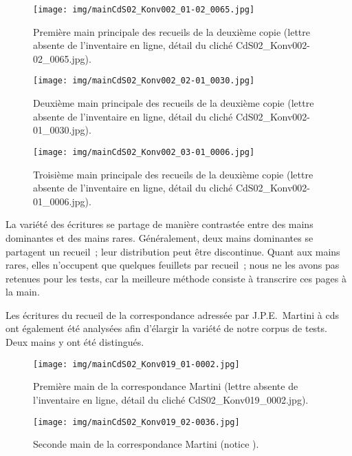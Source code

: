 \documentclass[a4paper,12pt,twoside]{book}
\begin{document}
				\begin{figure}[!h]
					\centering
					\texttt{[image: img/mainCdS02\_Konv002\_01-02\_0065.jpg]}
					\caption{Première main principale des recueils de la deuxième copie (lettre absente de l'inventaire en ligne, détail du cliché CdS02\_Konv002-02\_0065.jpg).}
					\label{}
				\end{figure}
				
				\begin{figure}[!h]
					\centering
					\texttt{[image: img/mainCdS02\_Konv002\_02-01\_0030.jpg]}
					\caption{Deuxième main principale des recueils de la deuxième copie (lettre absente de l'inventaire en ligne, détail du cliché CdS02\_Konv002-01\_0030.jpg).}
					\label{}
				\end{figure}
			
				\begin{figure}[!h]
					\centering
					\texttt{[image: img/mainCdS02\_Konv002\_03-01\_0006.jpg]}
					\caption{Troisième main principale des recueils de la deuxième copie  (lettre absente de l'inventaire en ligne, détail du cliché CdS02\_Konv002-01\_0006.jpg).}
					\label{}
				\end{figure}
				
				La variété des écritures se partage de manière contrastée entre des mains dominantes et des mains rares. Généralement, deux mains dominantes se partagent un recueil~; leur distribution peut être discontinue. Quant aux mains rares, elles n'occupent que quelques feuillets par recueil~; nous ne les avons pas retenues pour les tests, car la meilleure méthode consiste à transcrire ces pages à la main.
					
				Les écritures du recueil de la correspondance adressée par J.P.E.~Martini à \gls{cds} ont également été analysées afin d'élargir la variété de notre corpus de tests. Deux mains y ont été distingués.
				
				\begin{figure}[!h]
					\centering
					\texttt{[image: img/mainCdS02\_Konv019\_01-0002.jpg]}
					\caption{Première main de la correspondance Martini   (lettre absente de l'inventaire en ligne, détail du cliché CdS02\_Konv019\_0002.jpg).}
					\label{}
				\end{figure}
				
				\begin{figure}[!h]
					\centering
					\texttt{[image: img/mainCdS02\_Konv019\_02-0036.jpg]}
					\caption{Seconde main de la correspondance Martini (notice \cite{CdS19036037}).}
					\label{}
				\end{figure}
					
\end{document}
